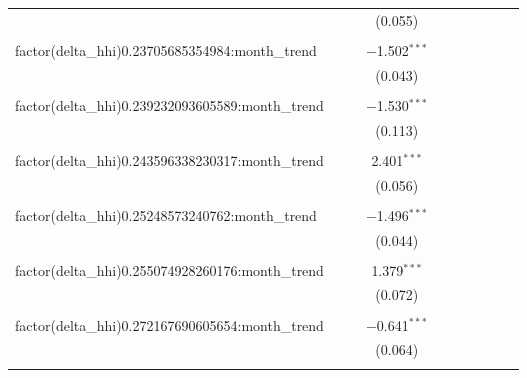 \begin{table}[H]
{\begin{tabular}{@{\extracolsep{5pt}}lccccccccc}
   &  &  & (0.055) &  &  &  &  &  &  \\  

   & & & & & & & & & \\  

  factor(delta\_hhi)0.23705685354984:month\_trend &  &  & $-$1.502$^{***}$ &  &  &  &  &  &  \\  

   &  &  & (0.043) &  &  &  &  &  &  \\  

   & & & & & & & & & \\  

  factor(delta\_hhi)0.239232093605589:month\_trend &  &  & $-$1.530$^{***}$ &  &  &  &  &  &  \\  

   &  &  & (0.113) &  &  &  &  &  &  \\  

   & & & & & & & & & \\  

  factor(delta\_hhi)0.243596338230317:month\_trend &  &  & 2.401$^{***}$ &  &  &  &  &  &  \\  

   &  &  & (0.056) &  &  &  &  &  &  \\  

   & & & & & & & & & \\  

  factor(delta\_hhi)0.25248573240762:month\_trend &  &  & $-$1.496$^{***}$ &  &  &  &  &  &  \\  

   &  &  & (0.044) &  &  &  &  &  &  \\  

   & & & & & & & & & \\  

  factor(delta\_hhi)0.255074928260176:month\_trend &  &  & 1.379$^{***}$ &  &  &  &  &  &  \\  

   &  &  & (0.072) &  &  &  &  &  &  \\  

   & & & & & & & & & \\  

  factor(delta\_hhi)0.272167690605654:month\_trend &  &  & $-$0.641$^{***}$ &  &  &  &  &  &  \\  

   &  &  & (0.064) &  &  &  &  &  &  \\  

   & & & & & & & & & \\  


\end{tabular}}
\end{table}

